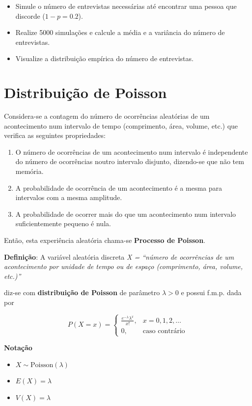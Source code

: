 \documentclass[
]{book}
\providecommand{\tightlist}{%
  \setlength{\itemsep}{0pt}\setlength{\parskip}{0pt}}
\begin{document}
\begin{itemize}
\tightlist
\item
  Simule o número de entrevistas necessárias até encontrar uma pessoa que discorde (\(1-p = 0.2\)).
\item
  Realize 5000 simulações e calcule a média e a variância do número de entrevistas.
\item
  Visualize a distribuição empírica do número de entrevistas.
\end{itemize}

\section{Distribuição de Poisson}\label{distribuiuxe7uxe3o-de-poisson}

Considera-se a contagem do número de ocorrências aleatórias de um acontecimento num intervalo de tempo (comprimento, área, volume, etc.) que verifica as seguintes propriedades:

\begin{enumerate}
\def\labelenumi{\arabic{enumi}.}
\item
  O número de ocorrências de um acontecimento num intervalo é independente do número de ocorrências noutro intervalo disjunto, dizendo-se que não tem memória.
\item
  A probabilidade de ocorrência de um acontecimento é a mesma para intervalos com a mesma amplitude.
\item
  A probabilidade de ocorrer mais do que um acontecimento num intervalo suficientemente pequeno é nula.
\end{enumerate}

Então, esta experiência aleatória chama-se \textbf{Processo de Poisson}.

\textbf{Definição}: A variável aleatória discreta \emph{X = ``número de ocorrências de um acontecimento por unidade de tempo ou de espaço (comprimento, área, volume, etc.)''}

diz-se com \textbf{distribuição de Poisson} de parâmetro \(\lambda > 0\) e possui f.m.p. dada por

\[
P(X = x) = \begin{cases} 
\frac{e^{-\lambda} \lambda^x}{x!}, & x = 0, 1, 2, \dots \\
0, & \text{caso contrário}
\end{cases}
\]

\textbf{Notação}

\begin{itemize}
\tightlist
\item
  \(X \sim \text{Poisson}(\lambda)\)
\item
  \(E(X) = \lambda\)
\item
  \(V(X) = \lambda\)
\end{itemize}
\end{document}
